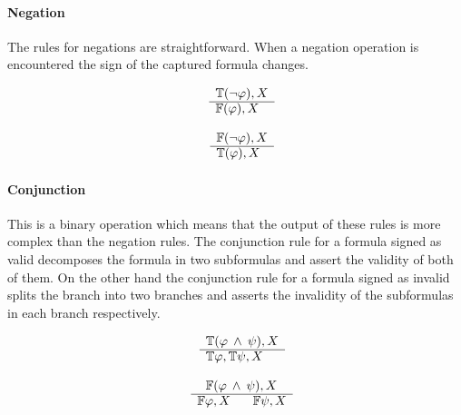 \documentclass{article}
\begin{document}
		\paragraph{Negation}
The rules for negations are straightforward. When a negation operation is encountered the sign of the captured formula changes.
		\newline
		\noindent\begin{minipage}{.5\linewidth}
		\begin{align*}
			\begin{array}{rl}
				& \mathbb{T}(\neg \varphi), X \\
				      \cline{2-2}
				      & \mathbb{F}(\varphi), X
			\end{array}
		\end{align*}
		\end{minipage}%
		\begin{minipage}{.5\linewidth}
		\begin{align*}
			\begin{array}{rl}
				& \mathbb{F}(\neg \varphi), X \\
			      \cline{2-2}
			      & \mathbb{T}(\varphi), X
			\end{array}
		\end{align*}
		\end{minipage}
		
		\paragraph{Conjunction}
This is a binary operation which means that the output of these rules is more complex than the negation rules.
The conjunction rule for a formula signed as valid decomposes the formula in two subformulas and assert the validity of both of them.
On the other hand the conjunction rule for a formula signed as invalid splits the branch into two branches and asserts the invalidity of the subformulas in each branch respectively.
		\newline
		\noindent\begin{minipage}{.5\linewidth}
		\begin{align*}
			\begin{array}{rl}
				& \mathbb{T}(\varphi \: \wedge \: \psi), X \\
			      \cline{2-2}
			      & \mathbb{T}\varphi, \mathbb{T}\psi, X
			\end{array}
		\end{align*}
		\end{minipage}%
		\begin{minipage}{.5\linewidth}
		\begin{align*}
			\begin{array}{rl}
				& \:\:\: \mathbb{F}(\varphi \: \wedge \: \psi), X \\
			      \cline{2-2}
			      & \mathbb{F}\varphi, X \:\:\:\:\:\:\:\: \mathbb{F}\psi, X
			\end{array}
		\end{align*}
		\end{minipage}
\end{document}
